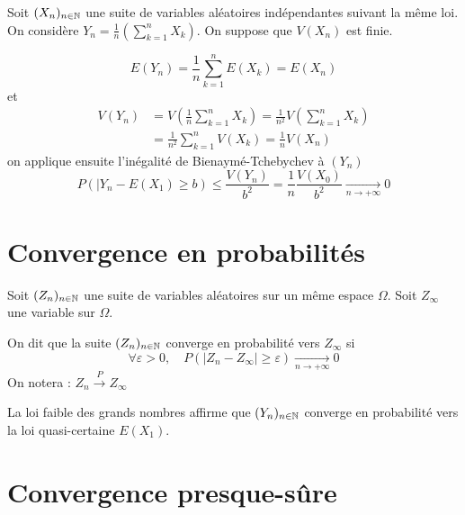 
\minitoc  %

Soit $(X_n)_{n \in \mathbb{N}}$ une suite de variables aléatoires indépendantes suivant la même loi.
On considère $Y_n = \frac{1}{n} (\sum_{k=1}^{n} X_k)$. On suppose que $V(X_n)$ est finie.

    \[ E(Y_n) = \frac{1}{n} \sum_{k=1}^{n} E(X_k) = E(X_n) \] 
et 
    \[ 
        \begin{aligned}
            V(Y_n) &= V \left( \frac{1}{n} \sum_{k=1}^{n} X_k \right)  = \frac{1}{n^2} V \left( \sum_{k=1}^{n} X_k \right)  \\
            &= \frac{1}{n^2} \sum_{k=1}^{n} V(X_k) = \frac{1}{n} V(X_n)
        \end{aligned}
     \] 
on applique ensuite l'inégalité de Bienaymé-Tchebychev à $(Y_n)$
        \[ \boxed{ P(|Y_n - E(X_1) \geq b) \leq \frac{V(Y_n)}{b^2} = \frac{1}{n} \frac{V(X_0)}{b^2} \underset{n \to + \infty}{\longrightarrow} 0 } \] 



\section*{Convergence en probabilités}

Soit $(Z_n)_{n \in \mathbb{N}}$ une suite de variables aléatoires sur un même espace $\Omega$. Soit $Z_\infty$ une variable sur $\Omega$. 

\begin{definition}
    On dit que la suite $(Z_n)_{n \in \mathbb{N}}$ converge en probabilité vers $Z_\infty$ si 
        \[ \forall \varepsilon > 0, \quad \boxed{ P(|Z_n - Z_\infty| \geq \varepsilon) \underset{n \to + \infty}{\longrightarrow} 0} \]
    On notera : $ Z_n \stackrel{P}{\longrightarrow} Z_\infty $
\end{definition}

\begin{remark}
    La loi faible des grands nombres affirme que $(Y_n)_{n \in \mathbb{N}}$ converge en probabilité vers la loi quasi-certaine $E(X_1)$.
\end{remark}


\section*{Convergence presque-sûre}

